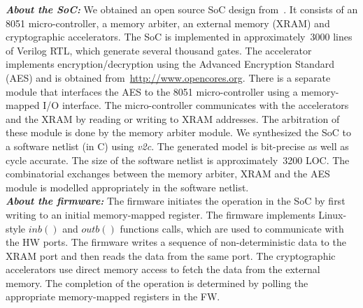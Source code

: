 \documentclass[sigconf]{acmart}
\begin{document}
\textbf{\emph{About the SoC:}}
%
We obtained an open source SoC design
from~\cite{DBLP:conf/fmcad/SubramanyanVRM15}.  It consists of an 8051
micro-controller, a memory arbiter, an external memory (XRAM) and
cryptographic accelerators.  The SoC is implemented in approximately~3000
lines of Verilog RTL, which generate several thousand gates.  The
accelerator implements encryption/decryption using the Advanced Encryption
Standard (AES) and is obtained
from~\href{http://www.opencores.org}{http://www.opencores.org}.  There is a
separate module that interfaces the AES to the 8051 micro-controller using a
memory-mapped I/O interface.  The micro-con\-tro\-ller communicates with the
accelerators and the XRAM by reading or writing to XRAM addresses.  The
arbitration of these module is done by the memory arbiter module.  We
synthesized the SoC to a software netlist (in C) using {\em v2c}.  The
generated model is bit-precise as well as cycle accurate.  The size of the
software netlist is approximately~3200 LOC.  The combinatorial exchanges
between the memory arbiter, XRAM and the AES module is modelled
appropriately in the software netlist.  \\

\textbf{\emph{About the firmware:}}
%
The firmware initiates the operation in the SoC by first writing to an
initial memory-mapped register.  The firmware implements Linux-style $inb()$
and $outb()$ functions calls, which are used to communicate with the HW
ports.  The firmware writes a sequence of non-deterministic data to the XRAM
port and then reads the data from the same port.  The cryptographic
accelerators use direct memory access to fetch the data from the external
memory.  The completion of the operation is determined by polling the
appropriate memory-mapped registers in the FW.
\end{document}
